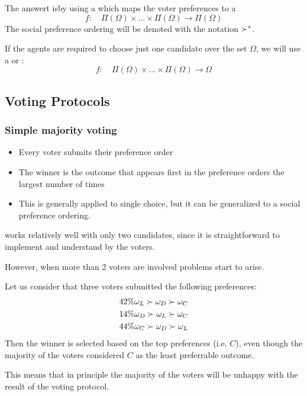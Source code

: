  The answert isby using a  which maps the voter preferences to a \\
 \[f:\quad \Pi(\Omega) \times ...\times\Pi(\Omega) \rightarrow \Pi(\Omega)\]
 The social preference ordering will be denoted with the notation $\succ^*$.
 
 If the agents are required to choose just one candidate over the set $\Omega$, we will use a  or :
 \[f:\quad \Pi(\Omega) \times ...\times\Pi(\Omega) \rightarrow \Omega\]

\subsection{Voting Protocols}
\subsubsection{Simple majority voting}
\begin{itemize}
\item Every voter submits their preference order
\item The winner is the outcome that appears first in the preference orders the largest number of times
\item This is generally applied to single choice, but it can be generalized to a social preference ordering.
\end{itemize}
 works relatively well with only two candidates, since it is straightforward to implement and understand by the voters.

However, when more than 2 voters are involved problems start to arise.

Let us consider that three voters submitted the following preferences:
\begin{align*}
42\%& \omega_L \succ \omega_D \succ \omega_C\\
14\%& \omega_D \succ \omega_L \succ \omega_C\\
44\%& \omega_C \succ \omega_D \succ \omega_L\\
\end{align*}
Then the winner is selected based on the top preferences (i.e. $C$), even though the majority of the voters considered $C$ as the least preferrable outcome.

This means that in principle the majority of the voters will be unhappy with the result of the voting protocol.

